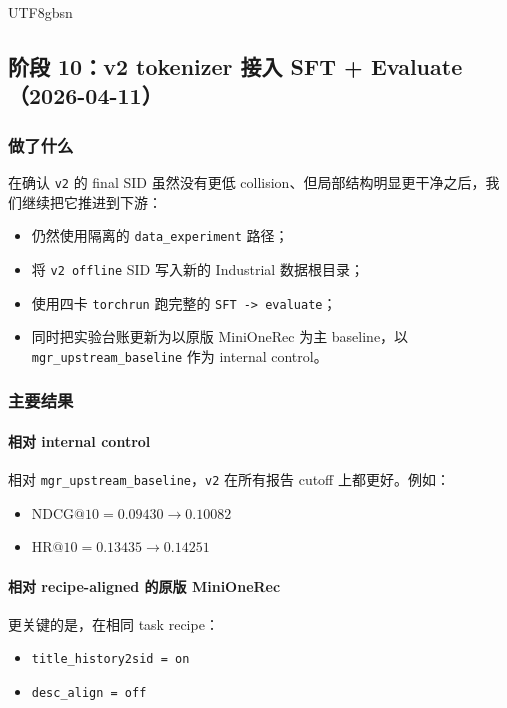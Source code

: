 \documentclass[11pt]{article}
\begin{document}
\begin{CJK*}{UTF8}{gbsn}
\subsection{阶段 10：v2 tokenizer 接入 SFT + Evaluate（2026-04-11）}

\subsubsection*{做了什么}

在确认 \texttt{v2} 的 final SID 虽然没有更低 collision、但局部结构明显更干净之后，我们继续把它推进到下游：

\begin{itemize}
  \item 仍然使用隔离的 \texttt{data\_experiment} 路径；
  \item 将 \texttt{v2 offline} SID 写入新的 Industrial 数据根目录；
  \item 使用四卡 \texttt{torchrun} 跑完整的 \texttt{SFT -> evaluate}；
  \item 同时把实验台账更新为以原版 MiniOneRec 为主 baseline，以 \texttt{mgr\_upstream\_baseline} 作为 internal control。
\end{itemize}

\subsubsection*{主要结果}

\paragraph{相对 internal control}

相对 \texttt{mgr\_upstream\_baseline}，\texttt{v2} 在所有报告 cutoff 上都更好。例如：

\begin{itemize}
  \item \(\mathrm{NDCG}@10 = 0.09430 \rightarrow 0.10082\)
  \item \(\mathrm{HR}@10 = 0.13435 \rightarrow 0.14251\)
\end{itemize}

\paragraph{相对 recipe-aligned 的原版 MiniOneRec}

更关键的是，在相同 task recipe：

\begin{itemize}
  \item \texttt{title\_history2sid = on}
  \item \texttt{desc\_align = off}
\end{itemize}


\end{CJK*}
\end{document}
